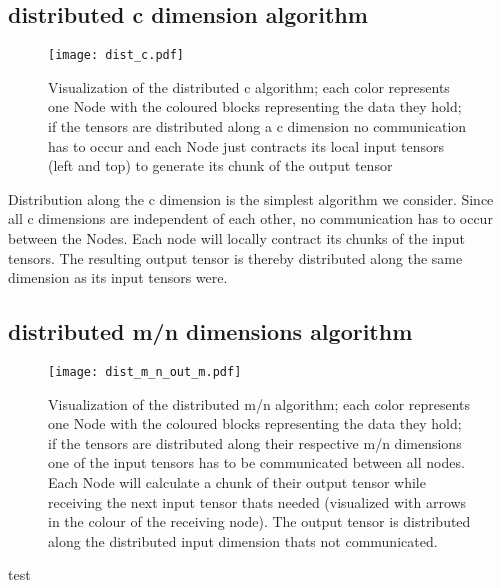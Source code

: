 \subsection{distributed c dimension algorithm}

\begin{figure}[h]
\centering\texttt{[image: dist\_c.pdf]}
\caption{Visualization of the distributed c algorithm; each color represents one Node with the coloured blocks representing the data they hold; if the tensors are distributed along a c dimension no communication has to occur and each Node just contracts its local input tensors (left and top) to generate its chunk of the output tensor}
\label{fig:c_algo}
\end{figure}

Distribution along the c dimension is the simplest algorithm we consider. 
Since all c dimensions are independent of each other, no communication has to occur between the Nodes.
Each node will locally contract its chunks of the input tensors.
The resulting output tensor is thereby distributed along the same dimension as its input tensors were.

\subsection{distributed m/n dimensions algorithm}

\begin{figure}[h]
\centering\texttt{[image: dist\_m\_n\_out\_m.pdf]}
\caption{Visualization of the distributed m/n algorithm; each color represents one Node with the coloured blocks representing the data they hold; if the tensors are distributed along their respective m/n dimensions one of the input tensors has to be communicated between all nodes. Each Node will calculate a chunk of their output tensor while receiving the next input tensor thats needed (visualized with arrows in the colour of the receiving node). The output tensor is distributed along the distributed input dimension thats not communicated.}
\label{fig:m_n_algo}
\end{figure}

test